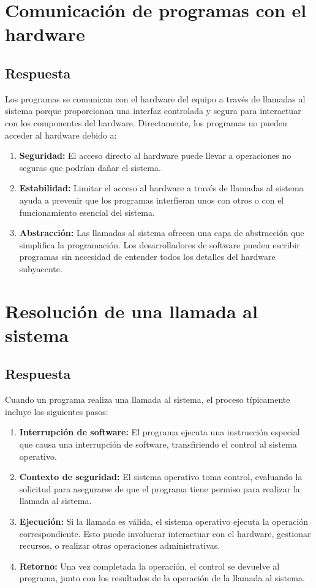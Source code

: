 \documentclass{article}
\begin{document}
\section{Comunicación de programas con el hardware}
\subsection{Respuesta}
Los programas se comunican con el hardware del equipo a través de llamadas al sistema porque proporcionan una interfaz controlada y segura para interactuar con los componentes del hardware. Directamente, los programas no pueden acceder al hardware debido a:
\begin{enumerate}
    \item \textbf{Seguridad:} El acceso directo al hardware puede llevar a operaciones no seguras que podrían dañar el sistema.
    \item \textbf{Estabilidad:} Limitar el acceso al hardware a través de llamadas al sistema ayuda a prevenir que los programas interfieran unos con otros o con el funcionamiento esencial del sistema.
    \item \textbf{Abstracción:} Las llamadas al sistema ofrecen una capa de abstracción que simplifica la programación. Los desarrolladores de software pueden escribir programas sin necesidad de entender todos los detalles del hardware subyacente.
\end{enumerate}

\section{Resolución de una llamada al sistema}
\subsection{Respuesta}
Cuando un programa realiza una llamada al sistema, el proceso típicamente incluye los siguientes pasos:
\begin{enumerate}
    \item \textbf{Interrupción de software:} El programa ejecuta una instrucción especial que causa una interrupción de software, transfiriendo el control al sistema operativo.
    \item \textbf{Contexto de seguridad:} El sistema operativo toma control, evaluando la solicitud para asegurarse de que el programa tiene permiso para realizar la llamada al sistema.
    \item \textbf{Ejecución:} Si la llamada es válida, el sistema operativo ejecuta la operación correspondiente. Esto puede involucrar interactuar con el hardware, gestionar recursos, o realizar otras operaciones administrativas.
    \item \textbf{Retorno:} Una vez completada la operación, el control se devuelve al programa, junto con los resultados de la operación de la llamada al sistema.
\end{enumerate}
\end{document}

